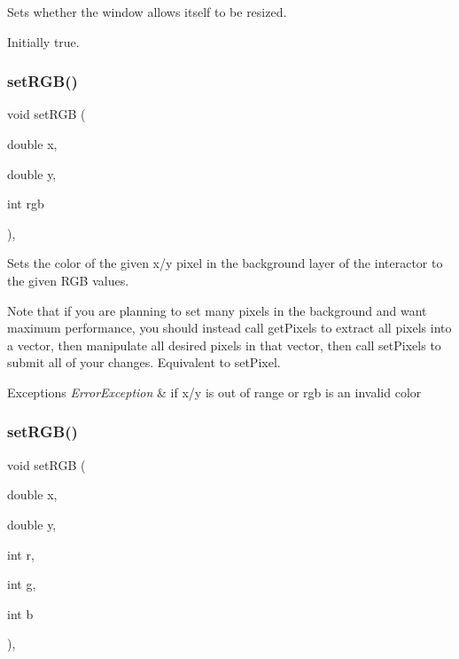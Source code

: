 Sets whether the window allows itself to be resized. 

Initially true. \mbox{\label{classsgl_1_1GDrawingSurface_a8bcbd65fa784bdab1e66a9efd381162d}} 
\subsubsection{\texorpdfstring{set\+R\+G\+B()}{setRGB()}\hspace{0.1cm}{\footnotesize\ttfamily [1/3]}}
{\footnotesize\ttfamily void set\+R\+GB (\begin{DoxyParamCaption}\item[{double}]{x,  }\item[{double}]{y,  }\item[{int}]{rgb }\end{DoxyParamCaption})\hspace{0.3cm}{\ttfamily [virtual]}, {\ttfamily [inherited]}}



Sets the color of the given x/y pixel in the background layer of the interactor to the given R\+GB values. 

Note that if you are planning to set many pixels in the background and want maximum performance, you should instead call get\+Pixels to extract all pixels into a vector, then manipulate all desired pixels in that vector, then call set\+Pixels to submit all of your changes. Equivalent to set\+Pixel.


\begin{DoxyExceptions}{Exceptions}
{\em Error\+Exception} & if x/y is out of range or rgb is an invalid color \\
\hline
\end{DoxyExceptions}
\mbox{\label{classsgl_1_1GDrawingSurface_a81202471d4fc9f2015aef0bc073acfab}} 
\subsubsection{\texorpdfstring{set\+R\+G\+B()}{setRGB()}\hspace{0.1cm}{\footnotesize\ttfamily [2/3]}}
{\footnotesize\ttfamily void set\+R\+GB (\begin{DoxyParamCaption}\item[{double}]{x,  }\item[{double}]{y,  }\item[{int}]{r,  }\item[{int}]{g,  }\item[{int}]{b }\end{DoxyParamCaption})\hspace{0.3cm}{\ttfamily [virtual]}, {\ttfamily [inherited]}}




